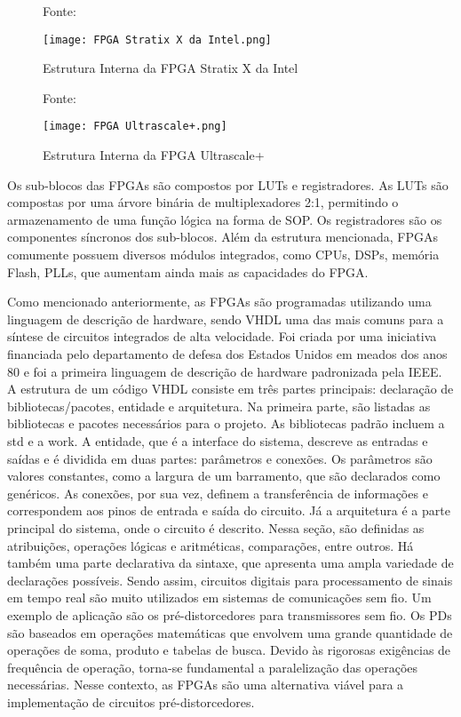 \begin{figure}[h!]
    \centering
    \captionsetup{justification=centering}
    \caption*{Fonte: \cite{Pedroni2010}}
    \texttt{[image: FPGA Stratix X da Intel.png]}
    \caption{Estrutura Interna da FPGA Stratix X da Intel}
    \label{fig:Stratix}
\end{figure}

\begin{figure}[h!]
    \centering
    \captionsetup{justification=centering}
    \caption*{Fonte: \cite{Pedroni2010}}
    \texttt{[image: FPGA Ultrascale+.png]}
    \caption{Estrutura Interna da FPGA Ultrascale+}
    \label{fig:Ultrascale}
\end{figure}

Os sub-blocos das FPGAs são compostos por LUTs e registradores. As LUTs são compostas por uma árvore binária de multiplexadores 2:1, permitindo o armazenamento de uma função lógica na forma de SOP. Os registradores são os componentes síncronos dos sub-blocos. Além da estrutura mencionada, FPGAs comumente possuem diversos módulos integrados, como CPUs, DSPs, memória Flash, PLLs, que aumentam ainda mais as capacidades do FPGA.

%


Como mencionado anteriormente, as FPGAs são programadas utilizando uma linguagem de descrição de hardware, sendo VHDL uma das mais comuns para a síntese de circuitos integrados de alta velocidade. Foi criada por uma iniciativa financiada pelo departamento de defesa dos Estados Unidos em meados dos anos 80 e foi a primeira linguagem de descrição de hardware padronizada pela IEEE.
A estrutura de um código VHDL consiste em três partes principais: declaração de bibliotecas/pacotes, entidade e arquitetura. Na primeira parte, são listadas as bibliotecas e pacotes necessários para o projeto. As bibliotecas padrão incluem a std e a work. A entidade, que é a interface do sistema, descreve as entradas e saídas e é dividida em duas partes: parâmetros e conexões. Os parâmetros são valores constantes, como a largura de um barramento, que são declarados como genéricos. As conexões, por sua vez, definem a transferência de informações e correspondem aos pinos de entrada e saída do circuito. Já a arquitetura é a parte principal do sistema, onde o circuito é descrito. Nessa seção, são definidas as atribuições, operações lógicas e aritméticas, comparações, entre outros. Há também uma parte declarativa da sintaxe, que apresenta uma ampla variedade de declarações possíveis.
Sendo assim, circuitos digitais para processamento de sinais em tempo real são muito utilizados em sistemas de comunicações sem fio. Um exemplo de aplicação são os pré-distorcedores para transmissores sem fio. Os PDs são baseados em operações matemáticas que envolvem uma grande quantidade de operações de soma, produto e tabelas de busca. Devido às rigorosas exigências de frequência de operação, torna-se fundamental a paralelização das operações necessárias. Nesse contexto, as FPGAs são uma alternativa viável para a implementação de circuitos pré-distorcedores.

